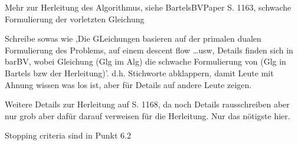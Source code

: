 
Mehr zur Herleitung des Algorithmus, siehe BartelsBVPaper S. 1163, schwache
Formulierung der vorletzten Gleichung

Schreibe sowas wie ,Die GLeichungen basieren auf der primalen dualen
Formulierung des Problems, auf einem descent flow \ldots usw,
Details finden sich in barBV, wobei Gleichung (Glg im Alg) die schwache
Formulierung von (Glg in Bartels bzw der Herleitung)'. d.h. Stichworte
abklappern, damit Leute mit Ahnung wissen was los ist, aber für Details
auf andere Leute zeigen.

Weitere Details zur Herleitung auf S. 1168, da noch Details rausschreiben
aber nur grob aber dafür darauf verweisen für die Herleitung. Nur das 
nötigste hier.


Stopping criteria sind in Punkt 6.2



